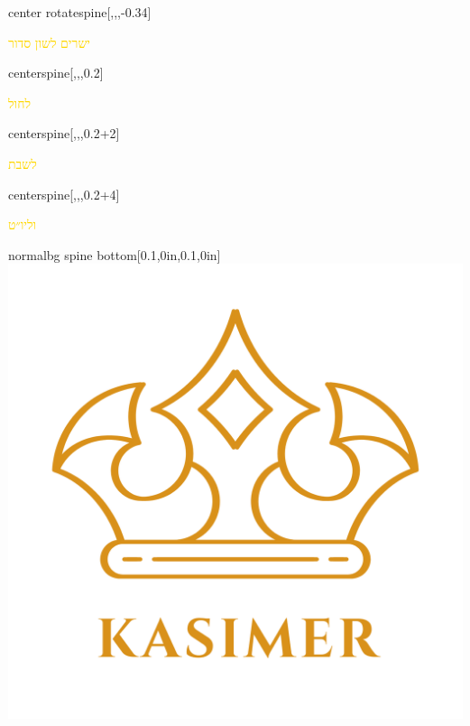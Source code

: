 \documentclass[
coverheight=8.75in,
coverwidth=5.625in,
spinewidth=1.063in,
bleedwidth=.75in,
marklength=0in,
12pt,
pagecolor=black,
]{bookcover}
\newcommand{\hebtext}[1]{
\begin{hebrew}
	#1
\end{hebrew}
}
\begin{document}
	\begin{bookcover}
	\begin{bookcoverelement}{center rotate}{spine}[,,,-0.34\coverheight]
		\LARGE\textcolor{gold}{\hebtext{ישרים לשון סדור} }
	\end{bookcoverelement}
	\begin{bookcoverelement}{center}{spine}[,,,0.2\coverheight]
	\textcolor{gold}{\hebtext{לחול}}
	\end{bookcoverelement}
	\begin{bookcoverelement}{center}{spine}[,,,0.2\coverheight+2\baselineskip]
	\textcolor{gold}{\hebtext{לשבת}}
	\end{bookcoverelement}
	\begin{bookcoverelement}{center}{spine}[,,,0.2\coverheight+4\baselineskip]
	\textcolor{gold}{\hebtext{וליו״ט}}
	\end{bookcoverelement}
	\begin{bookcoverelement}{normal}{bg spine bottom}[0.1\spinewidth,0in,0.1\spinewidth,0in]
		\includegraphics[width=0.8\spinewidth,height=0.8\spinewidth]{kasimer_logo.png}
	\end{bookcoverelement}
		

\end{bookcover}
\end{document}
